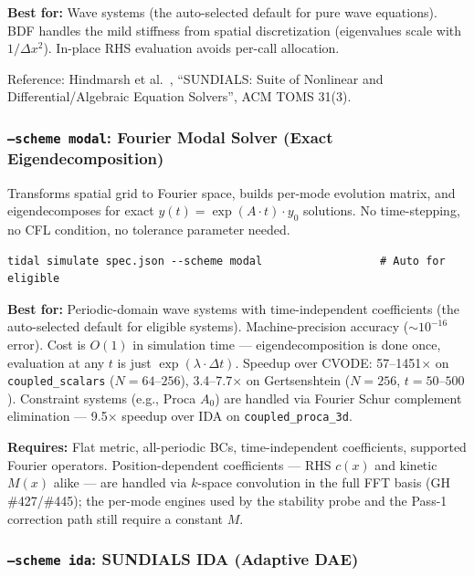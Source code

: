\textbf{Best for:} Wave systems (the auto-selected default for pure wave
equations). BDF handles the mild stiffness from spatial discretization
(eigenvalues scale with $1/\Delta x^2$). In-place RHS evaluation avoids
per-call allocation.

Reference: Hindmarsh et al.~\cite{hindmarsh2005sundials}, ``SUNDIALS: Suite of Nonlinear and
Differential/Algebraic Equation Solvers'', ACM TOMS 31(3).

\subsubsection{\texttt{--scheme modal}: Fourier Modal Solver (Exact Eigendecomposition)}
\label{sec:scheme-modal}

Transforms spatial grid to Fourier space, builds per-mode evolution matrix,
and eigendecomposes for exact $y(t) = \exp(A \cdot t) \cdot y_0$ solutions. No time-stepping,
no CFL condition, no tolerance parameter needed.

\begin{lstlisting}[style=bash]
tidal simulate spec.json --scheme modal                  # Auto for eligible
\end{lstlisting}

\textbf{Best for:} Periodic-domain wave systems with time-independent coefficients
(the auto-selected default for eligible systems). Machine-precision accuracy
($\sim 10^{-16}$ error). Cost is $O(1)$ in simulation time --- eigendecomposition is done
once, evaluation at any $t$ is just $\exp(\lambda \cdot \Delta t)$. Speedup over CVODE: 57--1451$\times$
on \texttt{coupled\_scalars} ($N=64$--$256$), 3.4--7.7$\times$ on Gertsenshtein ($N=256$, $t=50$--$500$).
Constraint systems (e.g., Proca $A_0$) are handled via Fourier Schur complement
elimination --- 9.5$\times$ speedup over IDA on \texttt{coupled\_proca\_3d}.

\textbf{Requires:} Flat metric, all-periodic BCs, time-independent coefficients,
supported Fourier operators. Position-dependent coefficients --- RHS $c(x)$ and
kinetic $M(x)$ alike --- are handled via $k$-space convolution in the full FFT
basis (GH \#427/\#445); the per-mode engines used by the stability probe and
the Pass-1 correction path still require a constant $M$.

\subsubsection{\texttt{--scheme ida}: SUNDIALS IDA (Adaptive DAE)}
\label{sec:scheme-ida}

